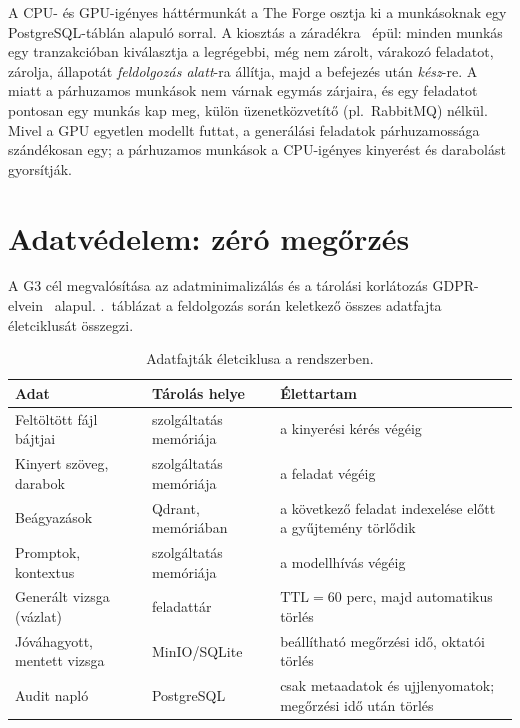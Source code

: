A CPU- és GPU-igényes háttérmunkát a The Forge osztja ki a munkásoknak egy PostgreSQL-táblán alapuló
sorral. A kiosztás a  záradékra~\cite{postgres2024skiplocked}
épül: minden munkás egy tranzakcióban kiválasztja a legrégebbi, még nem zárolt, várakozó feladatot,
zárolja, állapotát \emph{feldolgozás alatt}-ra állítja, majd a befejezés után \emph{kész}-re. A
 miatt a párhuzamos munkások nem várnak egymás zárjaira, és egy feladatot pontosan egy
munkás kap meg, külön üzenetközvetítő (pl.\ RabbitMQ) nélkül. Mivel a GPU egyetlen modellt futtat, a
generálási feladatok párhuzamossága szándékosan egy; a párhuzamos munkások a CPU-igényes kinyerést és
darabolást gyorsítják.

\section{Adatvédelem: zéró megőrzés}
\label{sec:zero}

A G3 cél megvalósítása az adatminimalizálás és a tárolási korlátozás GDPR-elvein~\cite{gdpr2016}
alapul. \Az{\ref{tab:eletciklus}}.~táblázat a feldolgozás során keletkező összes adatfajta életciklusát
összegzi.

\begin{table}[htbp]
\centering
\caption{Adatfajták életciklusa a \Mimir{} rendszerben.}
\label{tab:eletciklus}
\small
\begin{tabularx}{\textwidth}{@{}>{\raggedright\arraybackslash}p{3.4cm}>{\raggedright\arraybackslash}p{3.0cm}>{\raggedright\arraybackslash}X@{}}
\toprule
Adat & Tárolás helye & Élettartam \\
\midrule
Feltöltött fájl bájtjai & szolgáltatás memóriája & a kinyerési kérés végéig \\
Kinyert szöveg, darabok & szolgáltatás memóriája & a feladat végéig \\
Beágyazások & Qdrant, memóriában & a következő feladat indexelése előtt a gyűjtemény törlődik \\
Promptok, kontextus & szolgáltatás memóriája & a modellhívás végéig \\
Generált vizsga (vázlat) & feladattár & $\mathrm{TTL}=60$ perc, majd automatikus törlés \\
Jóváhagyott, mentett vizsga & MinIO/SQLite & beállítható megőrzési idő, oktatói törlés \\
Audit napló & PostgreSQL & csak metaadatok és ujjlenyomatok; megőrzési idő után törlés \\
\bottomrule
\end{tabularx}
\end{table}

